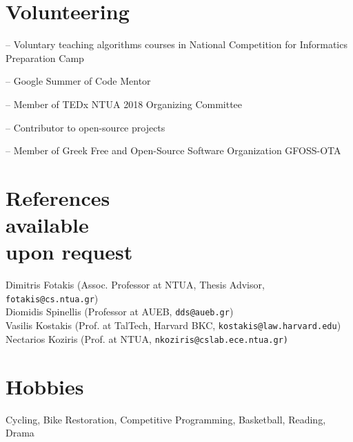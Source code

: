 \documentclass[margin]{res}
\newcommand{\field}[2]{\noindent \textbf{#1} \hfill #2 \\}
\begin{document}
\begin{resume}
\section{Volunteering} 
\begin{compactitem}
    \item[--] Voluntary teaching algorithms courses in National Competition for Informatics Preparation Camp 
    \item[--] Google Summer of Code Mentor
    \item[--] Member of TEDx NTUA 2018 Organizing Committee 
    \item[--] Contributor to open-source projects
    \item[--] Member of Greek Free and Open-Source Software Organization GFOSS-OTA

\end{compactitem}

\section{References \\ available \\ upon request}
Dimitris Fotakis \hfill (Assoc. Professor at NTUA, Thesis Advisor, \texttt{fotakis@cs.ntua.gr}) \\
Diomidis Spinellis \hfill (Professor at AUEB, \texttt{dds@aueb.gr}) \\
Vasilis Kostakis \hfill (Prof. at TalTech, Harvard BKC, \texttt{kostakis@law.harvard.edu}) \\
Nectarios Koziris \hfill (Prof. at NTUA, \texttt{nkoziris@cslab.ece.ntua.gr)}

\section{Hobbies}
Cycling, Bike Restoration, Competitive Programming, Basketball, Reading, Drama


\begin{comment}

\section{Selected \\ Projects \& Published \\ Software} 

\field{SADE} {\emph{August 2018 --}}
This project aims to perform software clusterings using vector semantics and the call graphs. The project had successfull results on recovering clusters of the Linux Kernel.\\
Repository: \url{https://github.com/papachristoumarios/sade}


\end{comment}
\end{resume}
\end{document}
